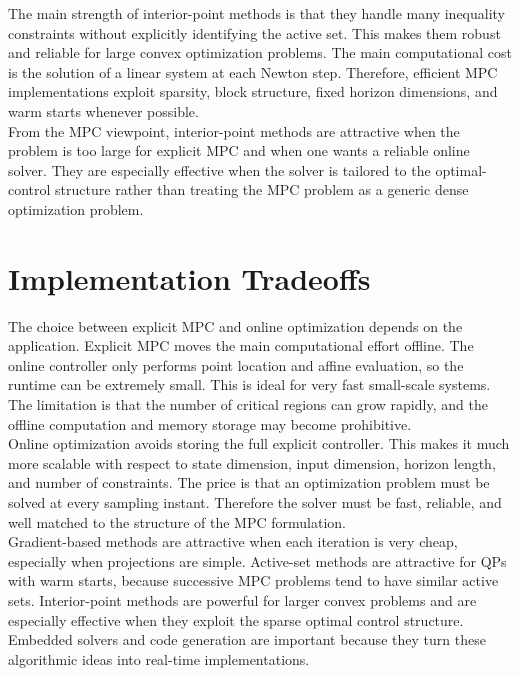 The main strength of interior-point methods is that they handle many inequality constraints
without explicitly identifying the active set. This makes them robust and reliable for large
convex optimization problems. The main computational cost is the solution of a linear system at
each Newton step. Therefore, efficient MPC implementations exploit sparsity, block structure,
fixed horizon dimensions, and warm starts whenever possible.\\
From the MPC viewpoint, interior-point methods are attractive when the problem is too large for
explicit MPC and when one wants a reliable online solver. They are especially effective when the
solver is tailored to the optimal-control structure rather than treating the MPC problem as a
generic dense optimization problem.

\section{Implementation Tradeoffs}

The choice between explicit MPC and online optimization depends on the application. Explicit
MPC moves the main computational effort offline. The online controller only performs point
location and affine evaluation, so the runtime can be extremely small. This is ideal for very fast
small-scale systems. The limitation is that the number of critical regions can grow rapidly, and
the offline computation and memory storage may become prohibitive.\\

Online optimization avoids storing the full explicit controller. This makes it much more scalable
with respect to state dimension, input dimension, horizon length, and number of constraints.
The price is that an optimization problem must be solved at every sampling instant. Therefore
the solver must be fast, reliable, and well matched to the structure of the MPC formulation.\\

Gradient-based methods are attractive when each iteration is very cheap, especially when
projections are simple. Active-set methods are attractive for QPs with warm starts, because
successive MPC problems tend to have similar active sets. Interior-point methods are powerful
for larger convex problems and are especially effective when they exploit the sparse optimal
control structure. Embedded solvers and code generation are important because they turn these
algorithmic ideas into real-time implementations.\\

